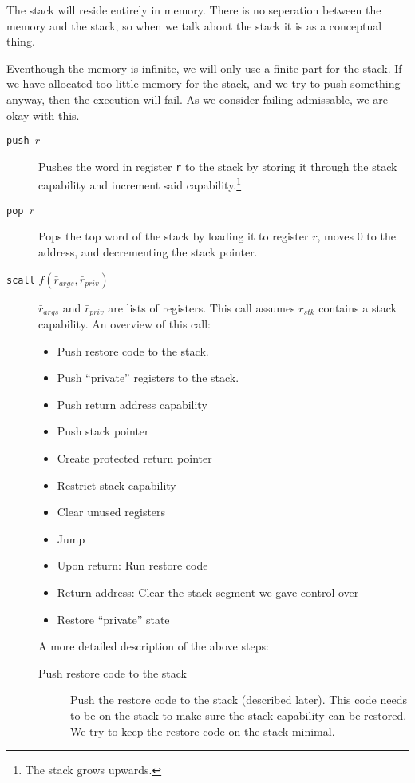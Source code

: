 \documentclass[a4paper]{article}
\newcommand{\var}[1]{\mathit{#1}}
\begin{document}
The stack will reside entirely in memory. There is no seperation between the memory and the stack, so when we talk about the stack it is as a conceptual thing.

Eventhough the memory is infinite, we will only use a finite part for the stack. If we have allocated too little memory for the stack, and we try to push something anyway, then the execution will fail. As we consider failing admissable, we are okay with this. 

\begin{description}
\item[\texttt{push $r$}] Pushes the word in register \texttt{r} to the stack by storing it through the stack capability and increment said capability.\footnote{The stack grows upwards.}
\item[\texttt{pop $r$}] Pops the top word of the stack by loading it to register $r$, moves 0 to the address, and decrementing the stack pointer.
\item[\texttt{scall} $f(\bar{r}_{\var{args}},\bar{r}_{\var{priv}})$] $\bar{r}_{\var{args}}$ and $\bar{r}_{\var{priv}}$ are lists of registers. This call assumes $r_{\var{stk}}$ contains a stack capability. An overview of this call:
  \begin{itemize}
  \item Push restore code to the stack.
  \item Push ``private'' registers to the stack.
  \item Push return address capability 
  \item Push stack pointer
  \item Create protected return pointer
  \item Restrict stack capability
  \item Clear unused registers
  \item Jump
  \item Upon return: Run restore code
  \item Return address: Clear the stack segment we gave control over
  \item Restore ``private'' state
  \end{itemize}
A more detailed description of the above steps:
\begin{description}
  \item [Push restore code to the stack]
    Push the restore code to the stack (described later). This code needs to be on the stack to make sure the stack capability can be restored. We try to keep the restore code on the stack minimal.

\end{description}
\end{description}
\end{document}
